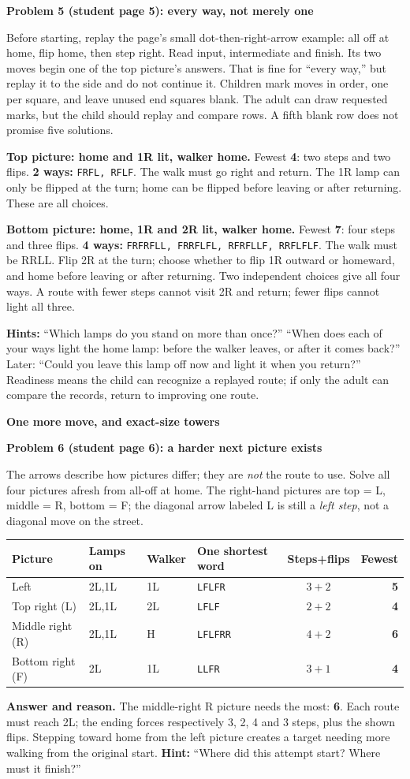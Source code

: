 \documentclass[11pt]{article}
\makeatletter
\newcommand{\head}[1]{\par\textbf{\large #1}\par}
\newcommand{\sub}[1]{\par\textbf{#1}\par}
\newcommand{\keyrow}[8]{#2 & #3 & #4 & \texttt{#5} & $#6+#7$ & \textbf{#8}\\}
\newcommand{\allways}[3]{\textbf{#2 ways:} \texttt{#3}}
\newenvironment{keytable}{\par\smallskip\begingroup\small\setlength{\tabcolsep}{7pt}\renewcommand{\arraystretch}{1.15}\begin{tabular}{@{}llllcr@{}}\textbf{Picture}&\textbf{Lamps on}&\textbf{Walker}&\textbf{One shortest word}&\textbf{Steps+flips}&\textbf{Fewest}\\\midrule}{\end{tabular}\endgroup\par\smallskip}
\makeatother
\begin{document}
\sub{Problem 5 (student page 5): every way, not merely one}
Before starting, replay the page's small dot-then-right-arrow example: all off at home, flip home, then step right. Read input, intermediate and finish. Its two moves begin one of the top picture's answers. That is fine for ``every way,'' but replay it to the side and do not continue it. Children mark moves in order, one per square, and leave unused end squares blank. The adult can draw requested marks, but the child should replay and compare rows. A fifth blank row does not promise five solutions.

\textbf{Top picture: home and 1R lit, walker home.} Fewest \textbf{4}: two steps and two flips. \allways{5top}{2}{FRFL, RFLF}. The walk must go right and return. The 1R lamp can only be flipped at the turn; home can be flipped before leaving or after returning. These are all choices.

\textbf{Bottom picture: home, 1R and 2R lit, walker home.} Fewest \textbf{7}: four steps and three flips. \allways{5bottom}{4}{FRFRFLL, FRRFLFL, RFRFLLF, RRFLFLF}. The walk must be RRLL. Flip 2R at the turn; choose whether to flip 1R outward or homeward, and home before leaving or after returning. Two independent choices give all four ways. A route with fewer steps cannot visit 2R and return; fewer flips cannot light all three.

\textbf{Hints:} ``Which lamps do you stand on more than once?'' ``When does each of your ways light the home lamp: before the walker leaves, or after it comes back?'' Later: ``Could you leave this lamp off now and light it when you return?'' Readiness means the child can recognize a replayed route; if only the adult can compare the records, return to improving one route.
\newpage
\head{One more move, and exact-size towers}
\sub{Problem 6 (student page 6): a harder next picture exists}
The arrows describe how pictures differ; they are \emph{not} the route to use. Solve all four pictures afresh from all-off at home. The right-hand pictures are top = L, middle = R, bottom = F; the diagonal arrow labeled L is still a \emph{left step}, not a diagonal move on the street.
\begin{keytable}
\keyrow{6start}{Left}{2L,1L}{1L}{LFLFR}{3}{2}{5}
\keyrow{6L}{Top right (L)}{2L,1L}{2L}{LFLF}{2}{2}{4}
\keyrow{6R}{Middle right (R)}{2L,1L}{H}{LFLFRR}{4}{2}{6}
\keyrow{6F}{Bottom right (F)}{2L}{1L}{LLFR}{3}{1}{4}
\end{keytable}
\textbf{Answer and reason.} The middle-right R picture needs the most: \textbf{6}. Each route must reach 2L; the ending forces respectively 3, 2, 4 and 3 steps, plus the shown flips. Stepping toward home from the left picture creates a target needing more walking from the original start.
\textbf{Hint:} ``Where did this attempt start? Where must it finish?''
\end{document}
